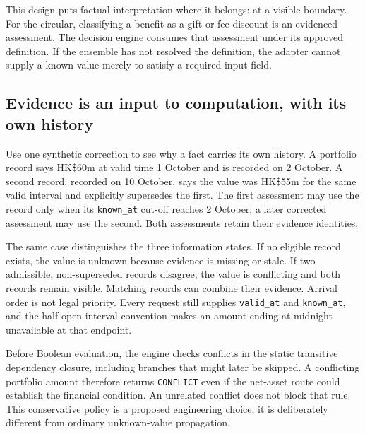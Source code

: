 This design puts factual interpretation where it belongs: at a visible boundary.
For the circular, classifying a benefit as a gift or fee discount is an evidenced
assessment. The decision engine consumes that assessment under its approved
definition. If the ensemble has not resolved the definition, the adapter cannot
supply a known value merely to satisfy a required input field.

\subsection{Evidence is an input to computation, with its own history}
\label{merge:P-03a-rule-contract:01}


Use one synthetic correction to see why a fact carries its own history. A portfolio
record says HK\$60m at valid time 1 October and is recorded on 2 October. A second
record, recorded on 10 October, says the value was HK\$55m for the same valid
interval and explicitly supersedes the first. The first assessment may use the
record only when its \texttt{known\_at} cut-off reaches 2 October; a later corrected
assessment may use the second. Both assessments retain their evidence identities.

The same case distinguishes the three information states. If no eligible record exists,
the value is unknown because evidence is missing or stale. If two admissible,
non-superseded records disagree, the value is conflicting and both records remain
visible. Matching records can combine their evidence. Arrival order is not legal
priority. Every request still supplies \texttt{valid\_at} and \texttt{known\_at},
and the half-open interval convention makes an amount ending at midnight unavailable at that endpoint.


Before Boolean evaluation, the engine checks conflicts in the static transitive
dependency closure, including branches that might later be skipped. A conflicting
portfolio amount therefore returns \texttt{CONFLICT} even if the net-asset route
could establish the financial condition. An unrelated conflict does not block
that rule. This conservative policy is a proposed engineering choice; it is
deliberately different from ordinary unknown-value propagation.

